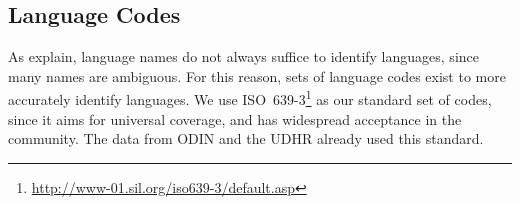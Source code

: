



\subsection{Language Codes}
As  explain, language names do not always suffice to identify languages, since many names are ambiguous. For this reason, sets of language codes exist to more accurately identify languages. We use ISO~639-3\footnote{\url{http://www-01.sil.org/iso639-3/default.asp}} as our standard set of codes, since it aims for universal coverage, and has widespread acceptance in the community. The data from ODIN and the UDHR already used this standard.

